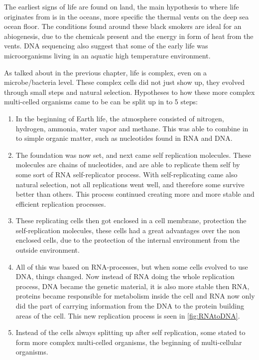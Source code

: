 The earliest signs of life are found on land, the main hypothesis to where life originates from is in the oceans, more specific the thermal vents on the deep sea ocean floor. The conditions found around these black smokers are ideal for an abiogenesis, due to the chemicals present and the energy in form of heat from the vents. DNA sequencing also suggest that some of the early life was microorganisms living in an aquatic high temperature environment.

As talked about in the previous chapter, life is complex, even on a microbe/bacteria level. These complex cells did not just show up, they evolved through small steps and natural selection. Hypotheses to how these more complex multi-celled organisms came to be can be split up in to 5 steps:
\begin{enumerate}
  \item In the beginning of Earth life, the atmosphere consisted of nitrogen, hydrogen, ammonia, water vapor and methane. This was able to combine in to simple organic matter, such as nucleotides found in RNA and DNA.
  \item The foundation was now set, and next came self replication molecules. These molecules are chains of nucleotides, and are able to replicate them self by some sort of RNA self-replicator process. With self-replicating came also natural selection, not all replications went well, and therefore some survive better than others. This process continued creating more and more stable and efficient replication processes.
  \item These replicating cells then got enclosed in a cell membrane, protection the self-replication molecules, these cells had a great advantages over the non enclosed cells, due to the protection of the internal environment from the outside environment.
  \item All of this was based on RNA-processes, but when some cells evolved to use DNA, things changed. Now instead of RNA doing the whole replication process, DNA became the genetic material, it is also more stable then RNA, proteins became responsible for metabolism inside the cell and RNA now only did the part of carrying information from the DNA to the protein building areas of the cell. This new replication process is seen in \ref{fig:RNAtoDNA}.
  \item Instead of the cells always splitting up after self replication, some stated to form more complex multi-celled organisms, the beginning of multi-cellular organisms.
\end{enumerate}
